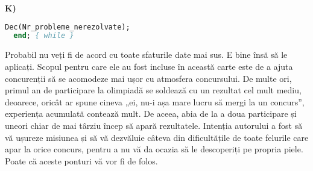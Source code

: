 {\bf K)}

\begin{lstlisting}[frame=single, language=Pascal]
    Dec(Nr_probleme_nerezolvate);
  end; { while }
\end{lstlisting}

\begin{center}
  {\Huge \decofourleft \decofourright}
\end{center}

Probabil nu veți fi de acord cu toate sfaturile date mai sus. E bine însă să
le aplicați. Scopul pentru care ele au fost incluse în această carte este de a
ajuta concurenții să se acomodeze mai ușor cu atmosfera concursului. De multe
ori, primul an de participare la olimpiadă se soldează cu un rezultat cel mult
mediu, deoarece, oricât ar spune cineva „ei, nu-i așa mare lucru să mergi la
un concurs”, experiența acumulată contează mult. De aceea, abia de la a doua
participare și uneori chiar de mai târziu încep să apară rezultatele. Intenția
autorului a fost să vă ușureze misiunea și să vă dezvăluie câteva din
dificultățile de toate felurile care apar la orice concurs, pentru a nu vă da
ocazia să le descoperiți pe propria piele. Poate că aceste ponturi vă vor fi
de folos.
